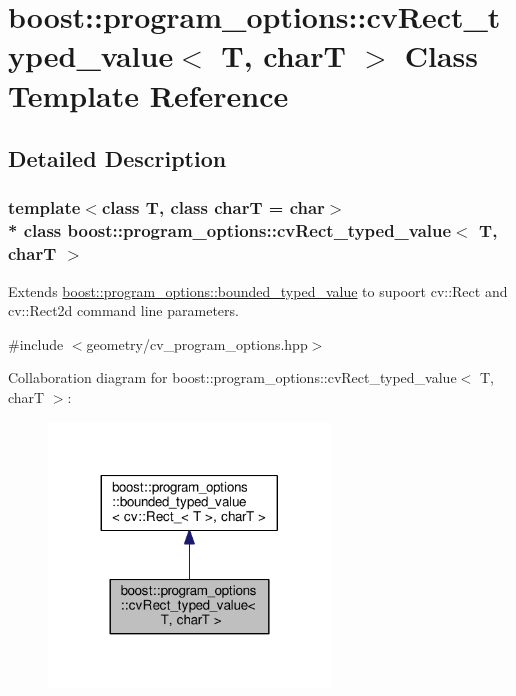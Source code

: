\hypertarget{structboost_1_1program__options_1_1cv_rect__typed__value}{}\section{boost\+:\+:program\+\_\+options\+:\+:cv\+Rect\+\_\+typed\+\_\+value$<$ T, charT $>$ Class Template Reference}
\label{structboost_1_1program__options_1_1cv_rect__typed__value}


\subsection{Detailed Description}
\subsubsection*{template$<$class T, class charT = char$>$\\*
class boost\+::program\+\_\+options\+::cv\+Rect\+\_\+typed\+\_\+value$<$ T, char\+T $>$}

Extends \hyperlink{classboost_1_1program__options_1_1bounded__typed__value}{boost\+::program\+\_\+options\+::bounded\+\_\+typed\+\_\+value} to supoort cv\+::\+Rect and cv\+::\+Rect2d command line parameters. 

{\ttfamily \#include $<$geometry/cv\+\_\+program\+\_\+options.\+hpp$>$}



Collaboration diagram for boost\+:\+:program\+\_\+options\+:\+:cv\+Rect\+\_\+typed\+\_\+value$<$ T, charT $>$\+:
\nopagebreak
\begin{figure}[H]
\begin{center}
\leavevmode
\includegraphics[width=212pt]{structboost_1_1program__options_1_1cv_rect__typed__value__coll__graph}
\end{center}
\end{figure}
